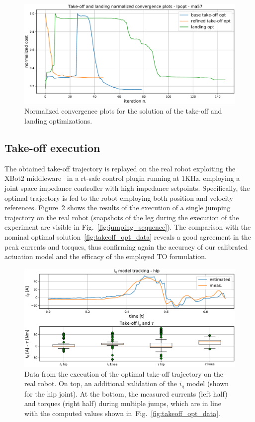 \begin{figure}[t]
	\centering
	\includegraphics[width=1\columnwidth]{images/solver_conv_plots.pdf}
	\caption{Normalized convergence plots for the solution of the take-off and landing optimizations.\vspace{-0.5cm}}
	\label{fig:convergence_plots}
\end{figure}
\subsection{Take-off execution}
The obtained take-off trajectory is replayed on the real robot exploiting the XBot2 middleware~\cite{xbot::LAURENZI2023104379} in a rt-safe control plugin running at $1\mathrm{KHz}$. employing a joint space impedance controller with high impedance setpoints. Specifically, the optimal trajectory is fed to the robot employing both position and velocity references. Figure~\ref{fig:takeoff_execution} shows the results of the execution of a single jumping trajectory on the real robot (snapshots of the leg during the execution of the experiment are visible in Fig.~\ref{fig:jumping_sequence}). The comparison with the nominal optimal solution~\ref{fig:takeoff_opt_data} reveals a good agreement in the peak currents and torques, thus confirming again the accuracy of our calibrated actuation model and the efficacy of the employed TO formulation.
\begin{figure}[h]
	\centering
	\includegraphics[width=1\columnwidth]{images/hardware_saturation.pdf}
	\caption{Data from the execution of the optimal take-off trajectory on the real robot. On top, an additional validation of the $i_q$ model (shown for the hip joint). At the bottom, the measured currents (left half) and torques (right half) during multiple jumps, which are in line with the computed values shown in~Fig.~\ref{fig:takeoff_opt_data}.\vspace{-0.3cm}}
	\label{fig:takeoff_execution}
\end{figure}
